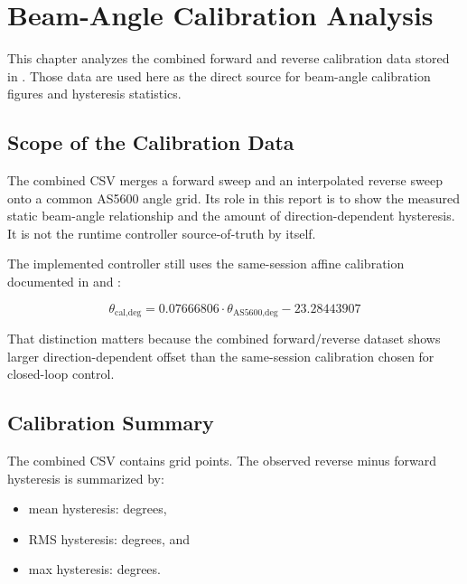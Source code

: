 \chapter{Beam-Angle Calibration Analysis}

This chapter analyzes the combined forward and reverse calibration data stored in
.
Those data are used here as the direct source for beam-angle calibration figures and
hysteresis statistics.

\section{Scope of the Calibration Data}

The combined CSV merges a forward sweep and an interpolated reverse sweep onto a common
AS5600 angle grid. Its role in this report is to show the measured static beam-angle
relationship and the amount of direction-dependent hysteresis. It is not the runtime
controller source-of-truth by itself.

The implemented controller still uses the same-session affine calibration documented in
 and :

\begin{equation}
  \theta_{\text{cal,deg}} = 0.07666806 \cdot \theta_{\text{AS5600,deg}} - 23.28443907
\end{equation}

That distinction matters because the combined forward/reverse dataset shows larger
direction-dependent offset than the same-session calibration chosen for closed-loop
control.

\section{Calibration Summary}

The combined CSV contains \CalibrationPointCount{} grid points. The observed reverse
minus forward hysteresis is summarized by:

\begin{itemize}
  \item mean hysteresis: \CalibrationMeanHysteresisDeg{} degrees,
  \item RMS hysteresis: \CalibrationRmsHysteresisDeg{} degrees, and
  \item max hysteresis: \CalibrationMaxHysteresisDeg{} degrees.
\end{itemize}

